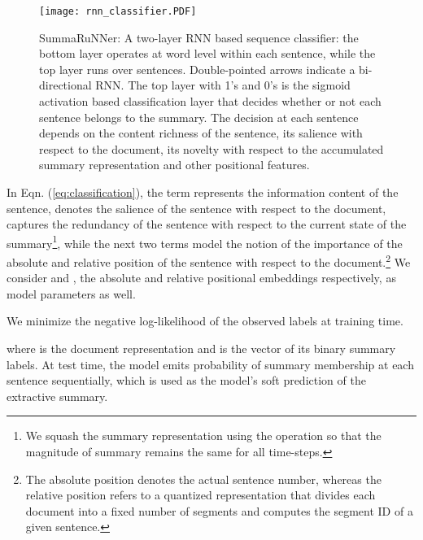\documentclass[letterpaper]{article}
\begin{document}
\begin{figure}[ht]
    \vspace{-0.3in}
	\centering
  \texttt{[image: rnn\_classifier.PDF]}
  	\vspace{-0.5in}
	\caption{{\small SummaRuNNer: A two-layer RNN based sequence classifier: the bottom layer operates at word level within each sentence, while the top layer runs over sentences. Double-pointed arrows indicate a bi-directional RNN. The top layer with 1's and 0's is the sigmoid activation based classification layer that decides whether or not each sentence belongs to the summary. The decision at each sentence depends on the content richness of the sentence, its salience with respect to the document, its novelty with respect to the accumulated summary representation and other positional features.}}
	\label{fig:rnn_classifier}
\end{figure}


In Eqn. (\ref{eq:classification}), the term  represents the information content of the  sentence,  denotes the salience of the sentence with respect to the document,  captures the redundancy of the sentence with respect to the current state of the summary\footnote{We squash the summary representation using the  operation so that the magnitude of summary remains the same for all time-steps.}, while the next two terms model the notion of the importance of the absolute and relative position of the sentence with respect to the document.\footnote{The absolute position denotes the actual sentence number, whereas the relative position refers to a quantized representation that divides each document into a fixed number of segments and computes the segment ID of a given sentence.} We consider  and , the absolute and relative positional embeddings respectively, as model parameters as well.

We minimize the negative log-likelihood of the observed labels at training time.

where  is the document representation and  is the vector of its binary summary labels. 
At test time, the model emits probability of summary membership  at each sentence sequentially, which is used as the model's soft prediction of the extractive summary. 
\end{document}
